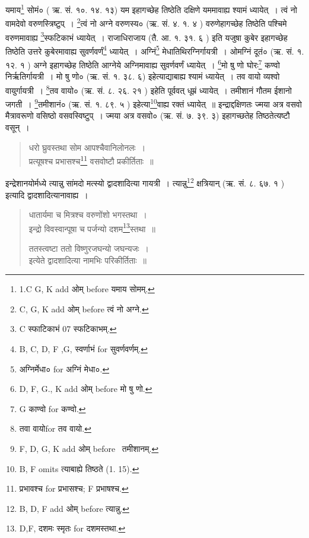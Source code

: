 \documentclass[11pt, openany]{book}
\begin{document}
\noindent
यमाय\renewcommand{\thefootnote}{1}\footnote{1.C G, K add ओम् before यमाय सोमम्.} सोमं० ( ऋ. सं. १०. १४. १३) यम इहागच्छेह तिष्ठेति दक्षिणे यममावाह्य श्यामं ध्यायेत्~। त्वं नो वामदेवो वरुणस्त्रिष्टुप्~। \renewcommand{\thefootnote}{2}\footnote{C, G, K add ओम् before त्वं नो अग्ने.}त्वं नो अग्ने वरुणस्य० (ऋ. सं. ४. १. ४ ) वरुणेहागच्छेह तिष्ठेति पश्चिमे वरुणमावाह्य \renewcommand{\thefootnote}{3}\footnote{C स्फाटिकाभं 07 स्फटिकाभम्.}स्फटिकाभं ध्यायेत्~। राजाधिराजाय (तै. आ. १. ३१. ६ ) इति यजुषा कुबेर इहागच्छेह तिष्ठेति उत्तरे कुबेरमावाह्य सुवर्णवर्णं\renewcommand{\thefootnote}{4}\footnote{B, C, D, F ,G, स्वर्णाभं for सुवर्णवर्णम्.} ध्यायेत्~। अग्निं\renewcommand{\thefootnote}{5}\footnote{अग्निर्मेधा० for अग्निं मेधा०.} मेधातिथिरग्निर्गायत्री~। ओमग्निं दूतं० (ऋ. सं. १. १२. १ ) अग्ने इहागच्छेह तिष्ठेति आग्नेये अग्निमावाह्य सुवर्णवर्णं ध्यायेत्~। \renewcommand{\thefootnote}{6}\footnote{D, F, G., K add ओम् before मो षु णो.}मो षु णो घोरः\renewcommand{\thefootnote}{7}\footnote{G काण्वो for कण्वो.} कण्वो निर्ऋतिर्गायत्री~। मो षु णो० (ऋ. सं. १. ३८. ६) इहेत्याद्याबाह्य श्यामं ध्यायेत्~। तव वायो व्यश्वो वायुर्गायत्री~। \renewcommand{\thefootnote}{8}\footnote{तवा वायोfor तव वायो.}तव वायो० (ऋ. सं. ८. २६. २१ ) इहेति पूर्ववत् धूम्रं ध्यायेत्~। तमीशानं गौतम ईशानो जगती~। \renewcommand{\thefootnote}{9}\footnote{F, D, G, K add ओम् before \textendash\ तमीशानम्.}तमीशानं० (ऋ. सं. १. ८९. ५ ) इहेत्या\renewcommand{\thefootnote}{10}\footnote{B, F omits त्याबाह्ये तिष्ठते (1. 15).}वाह्य रक्तं ध्यायेत्~॥ इन्द्राद्दक्षिणतः ज्मया अत्र वसवो मैत्रावरूणो वसिष्ठो वसवस्विष्टुप्~। ज्मया अत्र वसवो० (ऋ. सं. ७. ३९. ३) इहागच्छतेह तिष्ठतेत्यष्टौ वसून्~।

\begin{quote}
{\vy धरो घ्रुवस्तथा सोम आपश्चैवानिलोनलः~।\\
प्रत्यूषश्च प्रभासश्च\renewcommand{\thefootnote}{11}\footnote{प्रभावश्च for प्रभासश्च; F प्रभाषश्च.} वसवोष्टौ प्रकीर्तिताः~॥}
\end{quote}

\newpage

इन्द्रेशानयोर्मध्ये त्यान्नु सांमदो मत्स्यो द्वादशादित्या गायत्री~। त्यान्नु\renewcommand{\thefootnote}{1}\footnote{B, D, F add ओम् before त्यान्नु.} क्षत्रियान् (ऋ. सं. ८. ६७. १ ) इत्यादि द्वादशादित्यानावाह्य~।

\begin{quote}
{\vy धातार्यमा च मित्रश्च वरुणोंशो भगस्तथा~।\\
इन्द्रो विवस्वान्पूषा च पर्जन्यो दशम\renewcommand{\thefootnote}{2}\footnote{D,F, दशमः स्मृतः for दशमस्तथा.}स्तथा~॥

ततस्त्वष्टा ततो विष्णुरजघन्यो जघन्यजः~।\\
इत्येते द्वादशादित्या नामभिः परिकीर्तिताः~॥}
\end{quote}
\end{document}
